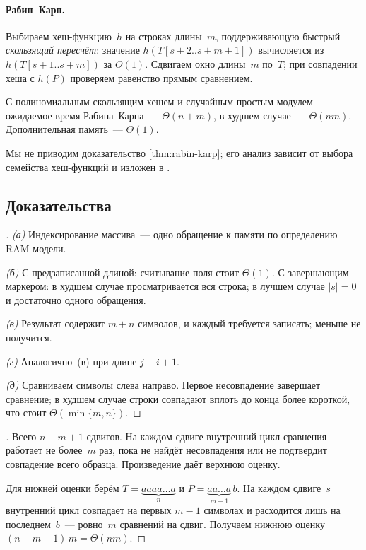 \paragraph{Рабин--Карп.} Выбираем хеш-функцию~$h$ на строках длины~$m$,
поддерживающую быстрый \emph{скользящий пересчёт}: значение
$h(T[s+2..s+m+1])$ вычисляется из $h(T[s+1..s+m])$ за $O(1)$.
Сдвигаем окно длины~$m$ по~$T$; при совпадении хеша с $h(P)$
проверяем равенство прямым сравнением.

\begin{theorem}
\label{thm:rabin-karp}
С полиномиальным скользящим хешем и случайным простым модулем
ожидаемое время Рабина--Карпа~--- $\Theta(n + m)$, в худшем случае~---
$\Theta(nm)$. Дополнительная память~--- $\Theta(1)$.
\end{theorem}

Мы не приводим доказательство \cref{thm:rabin-karp}; его анализ
зависит от выбора семейства хеш-функций и изложен в
\cite[\S~32.2]{CLRS2013}.

\subsection*{Доказательства}

\begin{proof}[]
\emph{(а)} Индексирование массива~--- одно обращение к памяти по
определению RAM-модели.

\emph{(б)} С предзаписанной длиной: считывание поля стоит $\Theta(1)$.
С завершающим маркером: в худшем случае просматривается вся строка;
в лучшем случае $|s| = 0$ и достаточно одного обращения.

\emph{(в)} Результат содержит $m + n$ символов, и каждый требуется
записать; меньше не получится.

\emph{(г)} Аналогично~(в) при длине $j - i + 1$.

\emph{(д)} Сравниваем символы слева направо. Первое несовпадение
завершает сравнение; в худшем случае строки совпадают вплоть до конца
более короткой, что стоит $\Theta(\min\{m, n\})$.
\end{proof}

\begin{proof}[]
Всего $n - m + 1$ сдвигов. На каждом сдвиге внутренний цикл
сравнения работает не более~$m$ раз, пока не найдёт несовпадения или
не подтвердит совпадение всего образца. Произведение даёт верхнюю
оценку.

Для нижней оценки берём
$T = \underbrace{aaaa\dots a}_{n}$ и
$P = \underbrace{aa\dots a}_{m - 1}\, b$. На каждом сдвиге~$s$
внутренний цикл совпадает на первых $m - 1$ символах и расходится
лишь на последнем~$b$~--- ровно~$m$ сравнений на сдвиг. Получаем
нижнюю оценку $(n - m + 1)\, m = \Theta(nm)$.
\end{proof}


